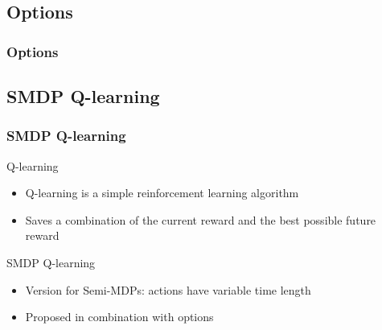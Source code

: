 \documentclass[aspectratio=169]{beamer}
\begin{document}
\subsection{Options}
\begin{frame}
	\frametitle{Options \cite{sutton1999between, barto2003recent}}
\end{frame}

\subsection{SMDP Q-learning}
\begin{frame}
	\frametitle{SMDP Q-learning \cite{sutton1999between}}
	\begin{block}{Q-learning}
		\begin{itemize}
			\item Q-learning is a simple reinforcement learning algorithm
			\item Saves a combination of the current reward and the best
				possible future reward
		\end{itemize}
	\end{block}
	\begin{block}{SMDP Q-learning}
		\begin{itemize}
			\item Version for Semi-MDPs: actions have variable time length
			\item Proposed in combination with options
		\end{itemize}
	\end{block}
\end{frame}
\end{document}
